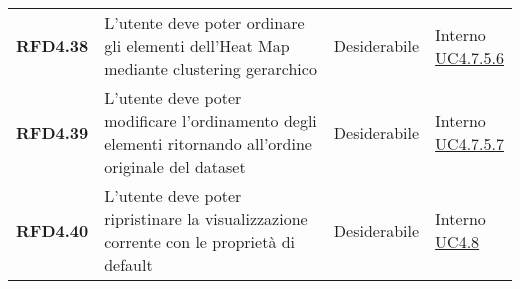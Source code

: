 \begin{longtable}[H]{>{\raggedright\bfseries}m{20mm} >{\raggedright}m{90mm} >{\raggedright}m{28mm} >{\raggedright\arraybackslash}m{30mm}}
    RFD4.38
    & L'utente deve poter ordinare gli elementi dell'Heat Map mediante clustering gerarchico
    & Desiderabile
    & \makecell{ Interno \\  \hyperref[spar:uc4.7.5.6]{UC4.7.5.6} }\\

    RFD4.39
    & L'utente deve poter modificare l'ordinamento degli elementi ritornando all'ordine originale del dataset
    & Desiderabile
    & \makecell{ Interno \\  \hyperref[spar:uc4.7.5.7]{UC4.7.5.7} }\\

    RFD4.40
    & L'utente deve poter ripristinare la visualizzazione corrente con le proprietà di default
    & Desiderabile
    & \makecell{ Interno \\  \hyperref[ssub:uc4.8]{UC4.8} }\\

\end{longtable}
